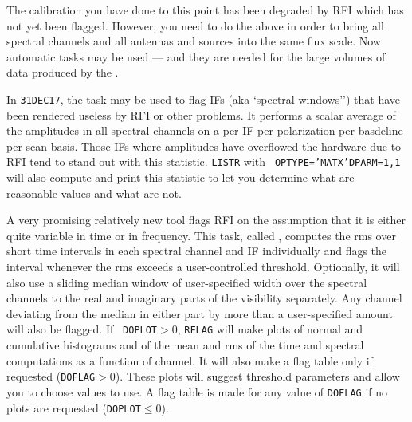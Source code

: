 
The calibration you have done to this point has been degraded by RFI
which has not yet been flagged.  However, you need to do the above in
order to bring all spectral channels and all antennas and sources into
the same flux scale.  Now automatic tasks may be used --- and they are
needed for the large volumes of data produced by the \@.

In {\tt 31DEC17}, the task {\tt {}} may be used to flag IFs
(aka `spectral windows'') that have been rendered useless by RFI or
other problems.  It performs a scalar average of the amplitudes in all
spectral channels on a per IF per polarization per basdeline per scan
basis.  Those IFs where amplitudes have overflowed the hardware due to
RFI tend to stand out with this statistic.  {\tt LISTR} with {\tt
OPTYPE='MATX'\qs DPARM=1,1} will also compute and print this statistic
to let you determine what are reasonable values and what are not.

A very promising relatively new tool flags RFI on the assumption that
it is either quite variable in time or in frequency.  This task,
called {\tt {}}, computes the rms over short time intervals
in each spectral channel and IF individually and flags the interval
whenever the rms exceeds a user-controlled threshold.  Optionally, it
will also use a sliding median window of user-specified width over the
spectral channels to the real and imaginary parts of the visibility
separately.  Any channel deviating from the median in either part by
more than a user-specified amount will also be flagged.  If {\tt
DOPLOT}$> 0$, {\tt RFLAG} will make plots of normal and cumulative
histograms and of the mean and rms of the time and spectral
computations as a function of channel.  It will also make a flag table
only if requested ({\tt DOFLAG}$ > 0$).  These plots will suggest
threshold parameters and allow you to choose values to use.  A flag
table is made for any value of {\tt DOFLAG} if no plots are requested
({\tt DOPLOT}$\leq 0$).

